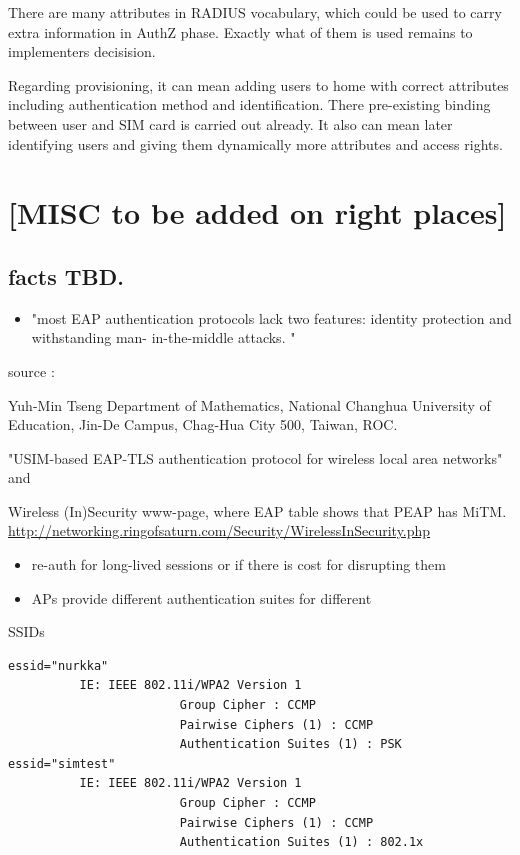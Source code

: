\documentclass[12pt,a4paper,english]{tutthesis}
\begin{document}
There are many attributes in RADIUS vocabulary, which could be 
used to carry extra information in AuthZ phase. Exactly what 
of them is used remains to implementers decisision.

Regarding provisioning, it can mean adding users to home with correct
attributes including authentication method and identification.
There pre-existing binding between user and SIM card is carried out
already. 
It also can mean later identifying users and giving them 
dynamically more attributes and access rights.
\chapter{[MISC to be added on right places]}
\label{sec-7}
\section{facts TBD.}
\label{sec-7-1}
\begin{itemize}
\item "most EAP authentication protocols lack two features: identity
protection and withstanding man- in-the-middle attacks. "
\end{itemize}
source :

Yuh-Min Tseng Department of Mathematics, National Changhua University of Education,
Jin-De Campus, Chag-Hua City 500, Taiwan, ROC.

"USIM-based EAP-TLS authentication protocol for
wireless local area networks" 
and 

Wireless (In)Security www-page, where 
EAP table shows that PEAP has MiTM.
\url{http://networking.ringofsaturn.com/Security/WirelessInSecurity.php}

\begin{itemize}
\item re-auth for long-lived sessions or if there is cost for disrupting them
\item APs provide different authentication suites for different
\end{itemize}
SSIDs 
\begin{verbatim}
essid="nurkka"
          IE: IEEE 802.11i/WPA2 Version 1
                        Group Cipher : CCMP
                        Pairwise Ciphers (1) : CCMP
                        Authentication Suites (1) : PSK
essid="simtest"
          IE: IEEE 802.11i/WPA2 Version 1
                        Group Cipher : CCMP
                        Pairwise Ciphers (1) : CCMP
                        Authentication Suites (1) : 802.1x
\end{verbatim}
\end{document}
